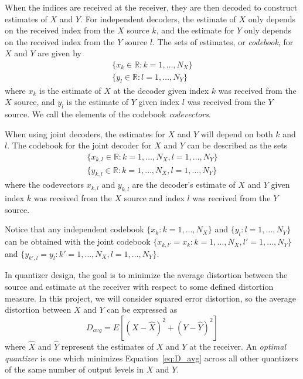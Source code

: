 \documentclass[10pt]{article}
\newcommand{\real}{\mathbb{R}}
\begin{document}
When the indices are received at the receiver, they are then decoded to construct estimates of $X$ and $Y$. For independent decoders, the estimate of $X$ only depends on the received index from the $X$ source $k$, and the estimate for $Y$ only depends on the received index from the $Y$ source $l$. The sets of estimates, or \emph{codebook}, for $X$ and $Y$ are given by
\begin{gather*}
    \{x_k \in \real : k = 1,\ldots,N_X\} \\
    \{y_l \in \real : l = 1,\ldots,N_Y\}
\end{gather*}
where $x_k$ is the estimate of $X$ at the decoder given index $k$ was received from the $X$ source, and $y_l$ is the estimate of $Y$ given index $l$ was received from the $Y$ source. We call the elements of the codebook \emph{codevectors}.

When using joint decoders, the estimates for $X$ and $Y$ will depend on both $k$ and $l$. The codebook for the joint decoder for $X$ and $Y$ can be described as the sets
\begin{gather*}
    \{x_{k,l} \in \real : k = 1,\ldots,N_X, l = 1,\ldots,N_Y\} \\
    \{y_{k,l} \in \real : k = 1,\ldots,N_X, l = 1,\ldots,N_Y\}
\end{gather*}
where the codevectors $x_{k,l}$ and $y_{k,l}$ are the decoder's estimate of $X$ and $Y$ given index $k$ was received from the $X$ source and index $l$ was received from the $Y$ source.

Notice that any independent codebook $\{x_k : k = 1,\ldots,N_X\}$ and $\{y_l : l = 1,\ldots,N_Y\}$ can be obtained with the joint codebook $\{x_{k,l'}=x_k : k=1,\ldots,N_X, l'=1,\ldots,N_Y\}$ and $\{y_{k',l}=y_l : k'=1,\ldots,N_X, l=1,\ldots,N_Y\}$.

In quantizer design, the goal is to minimize the average distortion between the source and estimate at the receiver with respect to some defined distortion measure. In this project, we will consider squared error distortion, so the average distortion between $X$ and $Y$ can be expressed as
\begin{equation}
    \label{eq:D_avg}
    D_{avg} = E[{(X-\hat{X})}^2 + {(Y-\hat{Y})}^2]
\end{equation}
where $\hat{X}$ and $\hat{Y}$ represent the estimates of $X$ and $Y$ at the receiver. An \emph{optimal quantizer} is one which minimizes Equation~\ref{eq:D_avg} across all other quantizers of the same number of output levels in $X$ and $Y$.
\end{document}
